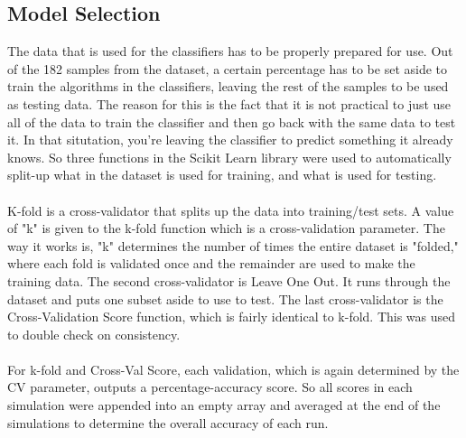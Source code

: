 \documentclass{report}
\begin{document}
\subsection{Model Selection}
The data that is used for the classifiers has to be properly prepared for use. Out of the 182 samples from the dataset, a certain percentage has to be set aside to train the 
algorithms in the classifiers, leaving the rest of the samples to be used as testing data. The reason for this is the fact that it is not practical to just use all of the 
data to train the classifier and then go back with the same data to test it. In that situtation, you're leaving the classifier to predict something it already knows. 
So three functions in the Scikit Learn library were used to automatically split-up what in the dataset is used for training, and what is used for testing. 
\\ \\K-fold is a cross-validator that splits up the data into training/test sets. A value of "k" is given to the k-fold function which is a cross-validation parameter. 
The way it works is, "k" determines the number of times the entire dataset is "folded," where each fold is validated once and the remainder are used to make the training data. 
The second cross-validator is Leave One Out. It runs through the dataset and puts one subset aside to use to test. The last cross-validator is the Cross-Validation Score function, 
which is fairly identical to k-fold. This was used to double check on consistency.
\\ \\For k-fold and Cross-Val Score, each validation, which is again determined by the CV parameter, outputs a percentage-accuracy score. So all scores in each simulation were 
appended into an empty array and averaged at the end of the simulations to determine the overall accuracy of each run.
\end{document}
